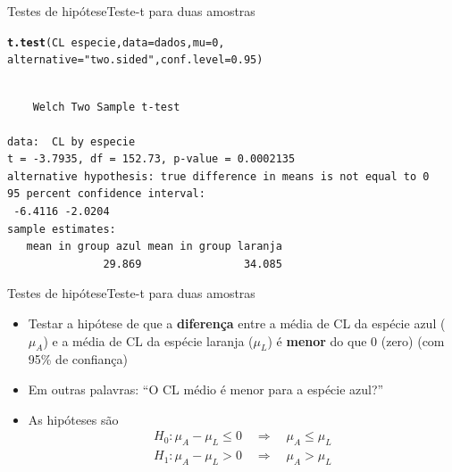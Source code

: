 \documentclass[10pt]{beamer}\usepackage[]{graphicx}\usepackage[]{color}
\makeatletter
\newcommand{\hlnum}[1]{\textcolor[rgb]{0.686,0.059,0.569}{#1}}%
\newcommand{\hlstr}[1]{\textcolor[rgb]{0.192,0.494,0.8}{#1}}%
\newcommand{\hlopt}[1]{\textcolor[rgb]{0,0,0}{#1}}%
\newcommand{\hlstd}[1]{\textcolor[rgb]{0.345,0.345,0.345}{#1}}%
\newcommand{\hlkwc}[1]{\textcolor[rgb]{0.333,0.667,0.333}{#1}}%
\newcommand{\hlkwd}[1]{\textcolor[rgb]{0.737,0.353,0.396}{\textbf{#1}}}%
\newenvironment{kframe}{%
 \def\at@end@of@kframe{}%
 \ifinner\ifhmode%
  \def\at@end@of@kframe{\end{minipage}}%
  \begin{minipage}{\columnwidth}%
 \fi\fi%
 \def\FrameCommand##1{\hskip\@totalleftmargin \hskip-\fboxsep
 \colorbox{shadecolor}{##1}\hskip-\fboxsep
     \hskip-\linewidth \hskip-\@totalleftmargin \hskip\columnwidth}%
 \MakeFramed {\advance\hsize-\width
   \@totalleftmargin\z@ \linewidth\hsize
   \@setminipage}}%
 {\par\unskip\endMakeFramed%
 \at@end@of@kframe}
\newenvironment{knitrout}{}{} %
\theoremstyle{definition}
\makeatother
\begin{document}
\begin{frame}[fragile=singleslide]{Testes de hipótese}{Teste-t para duas amostras}
\begin{knitrout}\small
{}\color{fgcolor}\begin{kframe}
\begin{alltt}
\hlkwd{t.test}\hlstd{(CL} \hlopt{~} \hlstd{especie,} \hlkwc{data} \hlstd{= dados,} \hlkwc{mu} \hlstd{=} \hlnum{0}\hlstd{,}
       \hlkwc{alternative} \hlstd{=} \hlstr{"two.sided"}\hlstd{,} \hlkwc{conf.level} \hlstd{=} \hlnum{0.95}\hlstd{)}
\end{alltt}
\begin{verbatim}

	Welch Two Sample t-test

data:  CL by especie
t = -3.7935, df = 152.73, p-value = 0.0002135
alternative hypothesis: true difference in means is not equal to 0
95 percent confidence interval:
 -6.4116 -2.0204
sample estimates:
   mean in group azul mean in group laranja 
               29.869                34.085 
\end{verbatim}
\end{kframe}
\end{knitrout}
\end{frame}

\begin{frame}[fragile=singleslide]{Testes de hipótese}{Teste-t para duas amostras}
  \begin{itemize}
  \item Testar a hipótese de que a \textbf{diferença} entre a média de
    CL da espécie azul ($\mu_A$) e a média de CL da espécie laranja
    ($\mu_L$) é \textbf{menor} do que 0 (zero) (com 95\% de confiança)
  \item Em outras palavras: ``O CL médio é menor para a espécie azul?''
  \item As hipóteses são
    \begin{align*}
      H_0: \mu_A - \mu_L \leq 0 \quad \Rightarrow \quad \mu_A \leq \mu_L \\
      H_1: \mu_A - \mu_L > 0 \quad \Rightarrow \quad \mu_A > \mu_L
    \end{align*}
  \end{itemize}
\end{frame}
\end{document}
